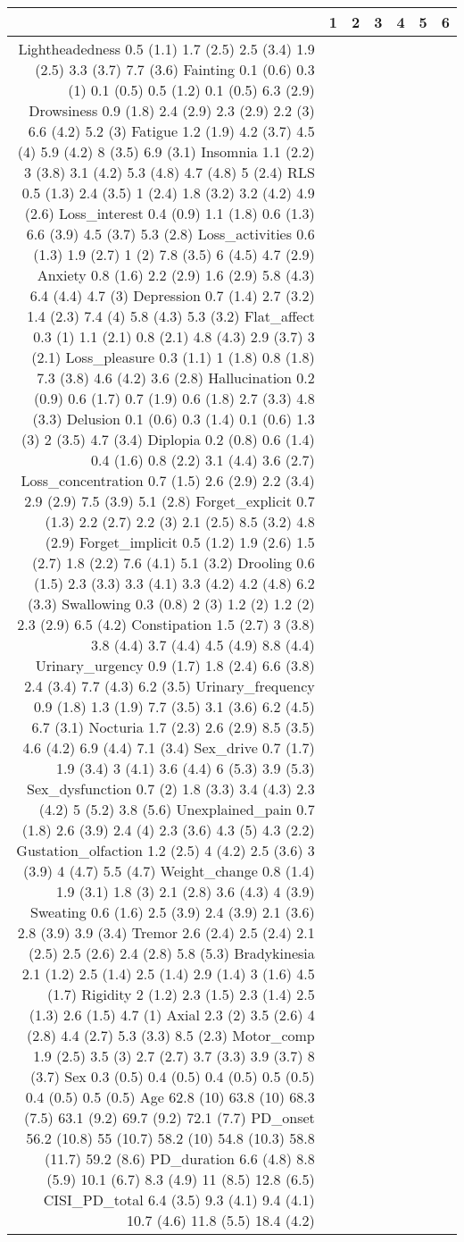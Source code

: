 \begin{table}[ht]
\centering
\begin{tabular}{rllllll}
  \toprule
 & 1 & 2 & 3 & 4 & 5 & 6 \\ 
  \midrule
Lightheadedness	0.5 (1.1)	1.7 (2.5)	2.5 (3.4)	1.9 (2.5)	3.3 (3.7)	7.7 (3.6) 
Fainting	0.1 (0.6)	0.3 (1)	0.1 (0.5)	0.5 (1.2)	0.1 (0.5)	6.3 (2.9) 
Drowsiness	0.9 (1.8)	2.4 (2.9)	2.3 (2.9)	2.2 (3)	6.6 (4.2)	5.2 (3) 
Fatigue	1.2 (1.9)	4.2 (3.7)	4.5 (4)	5.9 (4.2)	8 (3.5)	6.9 (3.1) 
Insomnia	1.1 (2.2)	3 (3.8)	3.1 (4.2)	5.3 (4.8)	4.7 (4.8)	5 (2.4) 
RLS	0.5 (1.3)	2.4 (3.5)	1 (2.4)	1.8 (3.2)	3.2 (4.2)	4.9 (2.6) 
Loss\_interest	0.4 (0.9)	1.1 (1.8)	0.6 (1.3)	6.6 (3.9)	4.5 (3.7)	5.3 (2.8) 
Loss\_activities	0.6 (1.3)	1.9 (2.7)	1 (2)	7.8 (3.5)	6 (4.5)	4.7 (2.9) 
Anxiety	0.8 (1.6)	2.2 (2.9)	1.6 (2.9)	5.8 (4.3)	6.4 (4.4)	4.7 (3) 
Depression	0.7 (1.4)	2.7 (3.2)	1.4 (2.3)	7.4 (4)	5.8 (4.3)	5.3 (3.2) 
Flat\_affect	0.3 (1)	1.1 (2.1)	0.8 (2.1)	4.8 (4.3)	2.9 (3.7)	3 (2.1) 
Loss\_pleasure	0.3 (1.1)	1 (1.8)	0.8 (1.8)	7.3 (3.8)	4.6 (4.2)	3.6 (2.8) 
Hallucination	0.2 (0.9)	0.6 (1.7)	0.7 (1.9)	0.6 (1.8)	2.7 (3.3)	4.8 (3.3) 
Delusion	0.1 (0.6)	0.3 (1.4)	0.1 (0.6)	1.3 (3)	2 (3.5)	4.7 (3.4) 
Diplopia	0.2 (0.8)	0.6 (1.4)	0.4 (1.6)	0.8 (2.2)	3.1 (4.4)	3.6 (2.7) 
Loss\_concentration	0.7 (1.5)	2.6 (2.9)	2.2 (3.4)	2.9 (2.9)	7.5 (3.9)	5.1 (2.8) 
Forget\_explicit	0.7 (1.3)	2.2 (2.7)	2.2 (3)	2.1 (2.5)	8.5 (3.2)	4.8 (2.9) 
Forget\_implicit	0.5 (1.2)	1.9 (2.6)	1.5 (2.7)	1.8 (2.2)	7.6 (4.1)	5.1 (3.2) 
Drooling	0.6 (1.5)	2.3 (3.3)	3.3 (4.1)	3.3 (4.2)	4.2 (4.8)	6.2 (3.3) 
Swallowing	0.3 (0.8)	2 (3)	1.2 (2)	1.2 (2)	2.3 (2.9)	6.5 (4.2) 
Constipation	1.5 (2.7)	3 (3.8)	3.8 (4.4)	3.7 (4.4)	4.5 (4.9)	8.8 (4.4) 
Urinary\_urgency	0.9 (1.7)	1.8 (2.4)	6.6 (3.8)	2.4 (3.4)	7.7 (4.3)	6.2 (3.5) 
Urinary\_frequency	0.9 (1.8)	1.3 (1.9)	7.7 (3.5)	3.1 (3.6)	6.2 (4.5)	6.7 (3.1) 
Nocturia	1.7 (2.3)	2.6 (2.9)	8.5 (3.5)	4.6 (4.2)	6.9 (4.4)	7.1 (3.4) 
Sex\_drive	0.7 (1.7)	1.9 (3.4)	3 (4.1)	3.6 (4.4)	6 (5.3)	3.9 (5.3) 
Sex\_dysfunction	0.7 (2)	1.8 (3.3)	3.4 (4.3)	2.3 (4.2)	5 (5.2)	3.8 (5.6) 
Unexplained\_pain	0.7 (1.8)	2.6 (3.9)	2.4 (4)	2.3 (3.6)	4.3 (5)	4.3 (2.2) 
Gustation\_olfaction	1.2 (2.5)	4 (4.2)	2.5 (3.6)	3 (3.9)	4 (4.7)	5.5 (4.7) 
Weight\_change	0.8 (1.4)	1.9 (3.1)	1.8 (3)	2.1 (2.8)	3.6 (4.3)	4 (3.9) 
Sweating	0.6 (1.6)	2.5 (3.9)	2.4 (3.9)	2.1 (3.6)	2.8 (3.9)	3.9 (3.4) 
Tremor	2.6 (2.4)	2.5 (2.4)	2.1 (2.5)	2.5 (2.6)	2.4 (2.8)	5.8 (5.3) 
Bradykinesia	2.1 (1.2)	2.5 (1.4)	2.5 (1.4)	2.9 (1.4)	3 (1.6)	4.5 (1.7) 
Rigidity	2 (1.2)	2.3 (1.5)	2.3 (1.4)	2.5 (1.3)	2.6 (1.5)	4.7 (1) 
Axial	2.3 (2)	3.5 (2.6)	4 (2.8)	4.4 (2.7)	5.3 (3.3)	8.5 (2.3) 
Motor\_comp	1.9 (2.5)	3.5 (3)	2.7 (2.7)	3.7 (3.3)	3.9 (3.7)	8 (3.7) 
Sex	0.3 (0.5)	0.4 (0.5)	0.4 (0.5)	0.5 (0.5)	0.4 (0.5)	0.5 (0.5) 
Age	62.8 (10)	63.8 (10)	68.3 (7.5)	63.1 (9.2)	69.7 (9.2)	72.1 (7.7) 
PD\_onset	56.2 (10.8)	55 (10.7)	58.2 (10)	54.8 (10.3)	58.8 (11.7)	59.2 (8.6) 
PD\_duration	6.6 (4.8)	8.8 (5.9)	10.1 (6.7)	8.3 (4.9)	11 (8.5)	12.8 (6.5) 
CISI\_PD\_total	6.4 (3.5)	9.3 (4.1)	9.4 (4.1)	10.7 (4.6)	11.8 (5.5)	18.4 (4.2) 
   \bottomrule
\end{tabular}
\end{table}
